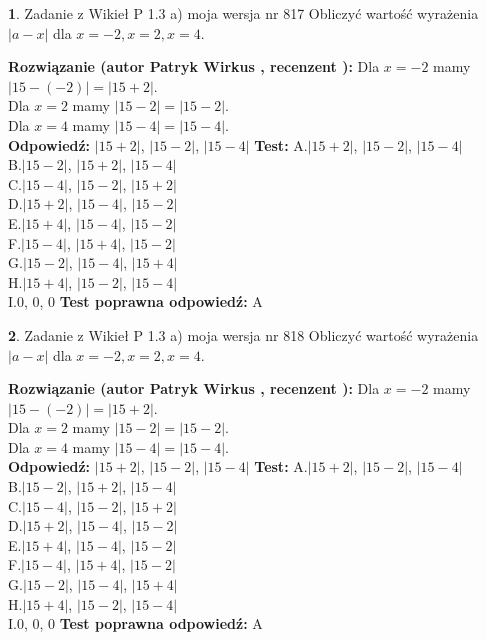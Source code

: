 \documentclass[12pt, a4paper]{article}
\theoremstyle{definition} %
\newtheorem{zad}{}
\newcommand{\zadStart}[1]{\begin{zad}#1\newline}
\newcommand{\zadStop}{\end{zad}}
\newcommand{\rozwStart}[2]{\noindent \textbf{Rozwiązanie (autor #1 , recenzent #2): }\newline}
\newcommand{\rozwStop}{\newline}
\newcommand{\odpStart}{\noindent \textbf{Odpowiedź:}\newline}
\newcommand{\odpStop}{\newline}
\newcommand{\testStart}{\noindent \textbf{Test:}\newline}
\newcommand{\testStop}{\newline}
\newcommand{\kluczStart}{\noindent \textbf{Test poprawna odpowiedź:}\newline}
\newcommand{\kluczStop}{\newline}
\begin{document}
\zadStart{Zadanie z Wikieł P 1.3 a) moja wersja nr 817}
Obliczyć wartość wyrażenia $|a - x|$ dla $x=-2,x=2,x=4$.
\zadStop
\rozwStart{Patryk Wirkus}{}
Dla $x = -2$ mamy $|15 - (-2)| = |15 + 2|$.\\
Dla $x = 2$ mamy $|15 - 2| = |15 - 2|$.\\
Dla $x = 4$ mamy $|15 - 4| = |15 - 4|$.\\
\rozwStop
\odpStart
$|15 + 2|$, $|15 - 2|$, $|15 - 4|$
\odpStop
\testStart
A.$|15 + 2|$, $|15 - 2|$, $|15 - 4|$\\
B.$|15 - 2|$, $|15 + 2|$, $|15 - 4|$\\
C.$|15 - 4|$, $|15 - 2|$, $|15 + 2|$\\
D.$|15 + 2|$, $|15 - 4|$, $|15 - 2|$\\
E.$|15 + 4|$, $|15 - 4|$, $|15 - 2|$\\
F.$|15 - 4|$, $|15 + 4|$, $|15 - 2|$\\
G.$|15 - 2|$, $|15 - 4|$, $|15 + 4|$\\
H.$|15 + 4|$, $|15 - 2|$, $|15 - 4|$\\
I.$0$, $0$, $0$
\testStop
\kluczStart
A
\kluczStop



\zadStart{Zadanie z Wikieł P 1.3 a) moja wersja nr 818}
Obliczyć wartość wyrażenia $|a - x|$ dla $x=-2,x=2,x=4$.
\zadStop
\rozwStart{Patryk Wirkus}{}
Dla $x = -2$ mamy $|15 - (-2)| = |15 + 2|$.\\
Dla $x = 2$ mamy $|15 - 2| = |15 - 2|$.\\
Dla $x = 4$ mamy $|15 - 4| = |15 - 4|$.\\
\rozwStop
\odpStart
$|15 + 2|$, $|15 - 2|$, $|15 - 4|$
\odpStop
\testStart
A.$|15 + 2|$, $|15 - 2|$, $|15 - 4|$\\
B.$|15 - 2|$, $|15 + 2|$, $|15 - 4|$\\
C.$|15 - 4|$, $|15 - 2|$, $|15 + 2|$\\
D.$|15 + 2|$, $|15 - 4|$, $|15 - 2|$\\
E.$|15 + 4|$, $|15 - 4|$, $|15 - 2|$\\
F.$|15 - 4|$, $|15 + 4|$, $|15 - 2|$\\
G.$|15 - 2|$, $|15 - 4|$, $|15 + 4|$\\
H.$|15 + 4|$, $|15 - 2|$, $|15 - 4|$\\
I.$0$, $0$, $0$
\testStop
\kluczStart
A
\kluczStop
\end{document}
